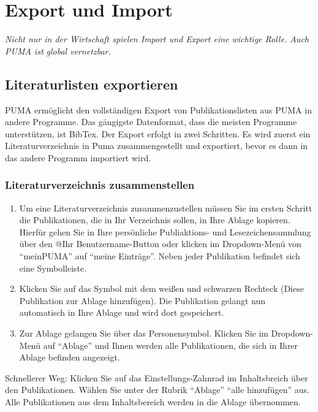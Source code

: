 \section{Export und Import}
\textit{Nicht nur in der Wirtschaft spielen Import und Export eine wichtige Rolle. Auch PUMA ist global vernetzbar.}
\subsection{Literaturlisten exportieren}
PUMA ermöglicht den vollständigen Export von Publikationslisten aus PUMA in andere Programme. Das gängigste Datenformat, dass die meisten Programme unterstützen, ist BibTex. \newline 
Der Export erfolgt in zwei Schritten. Es wird zuerst ein Literaturverzeichnis in Puma zusammengestellt und exportiert, bevor es dann in das andere Programm importiert wird.
\subsubsection{Literaturverzeichnis zusammenstellen}
\begin{enumerate}
    \item Um eine Literaturverzeichnis zusammenzustellen müssen Sie im ersten Schritt die Publikationen, die in Ihr Verzeichnis sollen, in Ihre Ablage kopieren. Hierfür gehen Sie in Ihre persönliche Publiaktions- und Lesezeichensammlung über den @Ihr Benutzername-Button oder klicken im Dropdown-Menü von \enquote{meinPUMA} auf \enquote{meine Einträge}.  Neben jeder Publikation befindet sich eine Symbolleiste.
    \item Klicken Sie auf das Symbol mit dem weißen und schwarzen Rechteck (Diese Publikation zur Ablage hinzufügen). Die Publikation gelangt nun automatisch in Ihre Ablage und wird dort gespeichert.
    \item Zur Ablage gelangen Sie über das Personensymbol. Klicken Sie im Dropdown-Menü auf \enquote{Ablage} und Ihnen werden alle Publikationen, die sich in Ihrer Ablage befinden angezeigt. 
\end{enumerate}
Schnellerer Weg: Klicken Sie auf das Einstellungs-Zahnrad im Inhaltsbreich über den Publikationen. Wählen Sie unter der Rubrik \enquote{Ablage} \enquote{alle hinzufügen} aus. Alle Publikationen aus dem Inhaltsbereich werden in die Ablage übernommen. 

